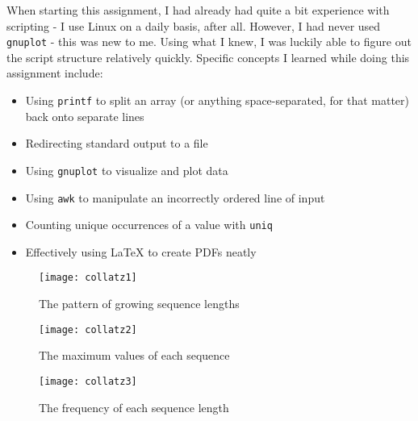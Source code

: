 \documentclass[12pt]{article}
\begin{document}
When starting this assignment, I had already had quite a bit experience with scripting - I use Linux on a daily basis, after all. However, I had never used \verb|gnuplot| - this was new to me. Using what I knew, I was luckily able to figure out the script structure relatively quickly. Specific concepts I learned while doing this assignment include:
\begin{itemize}
    \item Using \verb|printf| to split an array (or anything space-separated, for that matter) back onto separate lines
    \item Redirecting standard output to a file
    \item Using \verb|gnuplot| to visualize and plot data
    \item Using \verb|awk| to manipulate an incorrectly ordered line of input
    \item Counting unique occurrences of a value with \verb|uniq|
    \item Effectively using LaTeX to create PDFs neatly
\end{itemize}

\begin{figure}\begin{centering}
\texttt{[image: collatz1]}\caption{The pattern of growing sequence lengths}
\texttt{[image: collatz2]}\caption{The maximum values of each sequence}
\end{centering}\end{figure}
\begin{figure}\begin{centering}
\texttt{[image: collatz3]}\caption{The frequency of each sequence length}
\end{centering}\end{figure}
\end{document}
